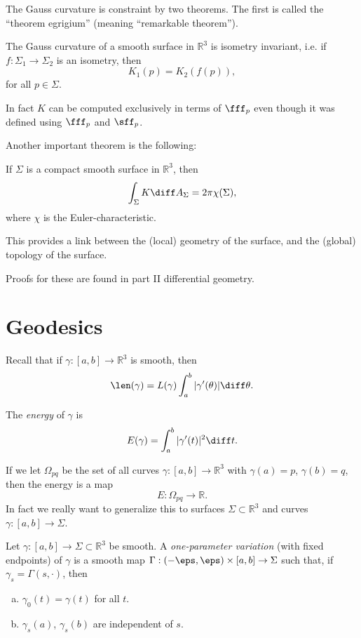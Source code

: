 \documentclass[12pt]{article}
\begin{document}

The Gauss curvature is constraint by two theorems. The first is called the ``theorem egrigium'' (meaning ``remarkable theorem'').

\begin{theorem}
	The Gauss curvature of a smooth surface in $\mathbb{R}^3$ is isometry invariant, i.e. if $f: \Sigma_1 \to \Sigma_2$ is an isometry, then
	\[
	K_1(p) = K_2(f(p)),
	\]
	for all $p \in \Sigma$.

	In fact $K$ can be computed exclusively in terms of $\fff_p$ even though it was defined using $\fff_p$ and $\sff_p$.
\end{theorem}

Another important theorem is the following:

\begin{theorem}
	If $\Sigma$ is a compact smooth surface in $\mathbb{R}^3$, then
	\[
	\int_{\Sigma} K \diff A_{\Sigma} = 2 \pi \chi(\Sigma),
	\]
	where $\chi$ is the Euler-characteristic.
\end{theorem}

This provides a link between the (local) geometry of the surface, and the (global) topology of the surface.

Proofs for these are found in part II differential geometry.

\newpage

\section{Geodesics}
\label{sec:geodesics}

Recall that if $\gamma : [a, b] \to \mathbb{R}^3$ is smooth, then
\[
\len(\gamma) = L(\gamma) \int_{a}^{b} |\gamma'(\theta)| \diff \theta.
\]
\begin{definition}
	The \emph{energy} of $\gamma$ is
	\[
	E(\gamma) = \int_{a}^{b} |\gamma'(t)|^2 \diff t.
	\]
\end{definition}

If we let $\Omega_{pq}$ be the set of all curves $\gamma : [a, b] \to \mathbb{R}^3$ with $\gamma(a) = p$, $\gamma(b) = q$, then the energy is a map
\[
E : \Omega_{pq} \to \mathbb{R}.
\]
In fact we really want to generalize this to surfaces $\Sigma \subset \mathbb{R}^3$ and curves $\gamma : [a, b] \to \Sigma$.

\begin{definition}
	Let $\gamma : [a, b] \to \Sigma \subset \mathbb{R}^3$ be smooth. A \emph{one-parameter variation} (with fixed endpoints) of $\gamma$ is a smooth map $\Gamma : (-\eps, \eps) \times [a, b] \to \Sigma$ such that, if $\gamma_s = \Gamma(s, \cdot)$, then
	\begin{enumerate}[(a)]
		\item $\gamma_0(t) = \gamma(t)$ for all $t$.
		\item $\gamma_s(a)$, $\gamma_s(b)$ are independent of $s$.
	\end{enumerate}
\end{definition}
\end{document}
